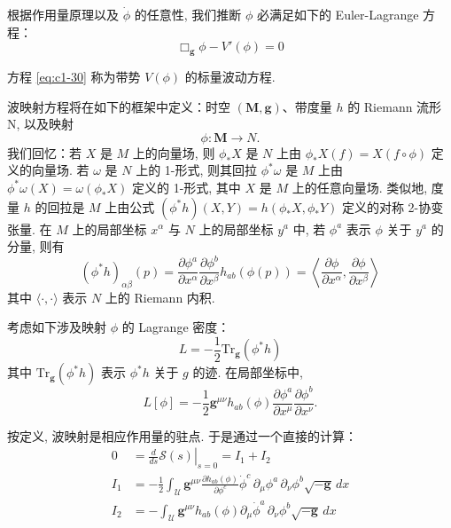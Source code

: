 根据作用量原理以及 $\dot{\phi}$ 的任意性, 我们推断 $\phi$ 必满足如下的 Euler-Lagrange 方程：
\begin{equation}
\Box_{\mathbf{g}}\phi - V'(\phi) = 0\label{eq:c1-30}
\end{equation}

方程 \eqref{eq:c1-30} 称为带势 $V(\phi)$ 的标量波动方程. 


波映射方程将在如下的框架中定义：时空 $(\mathbf{M}, \mathbf{g})$、带度量 $h$ 的 Riemann 流形 N, 以及映射
\[
\phi:\mathbf{M} \longrightarrow N.
\]
我们回忆：若 $X$ 是 $M$ 上的向量场, 则 $\phi_*X$ 是 $N$ 上由 $\phi_*X(f) = X(f\circ\phi)$ 定义的向量场. 若 $\omega$ 是 $N$ 上的 1-形式, 则其回拉 $\phi^*\omega$ 是 $M$ 上由 $\phi^*\omega(X) = \omega(\phi_*X)$ 定义的 1-形式, 其中 $X$ 是 $M$ 上的任意向量场. 类似地, 度量 $h$ 的回拉是 $M$ 上由公式 $(\phi^*h)(X, Y) = h(\phi_*X, \phi_*Y)$ 定义的对称 2-协变张量. 在 $M$ 上的局部坐标 $x^\alpha$ 与 $N$ 上的局部坐标 $y^a$ 中, 若 $\phi^a$ 表示 $\phi$ 关于 $y^a$ 的分量, 则有
\[
(\phi^*h)_{\alpha\beta}(p) = \frac{\partial\phi^a}{\partial x^\alpha}\frac{\partial\phi^b}{\partial x^\beta}h_{ab}(\phi(p)) = \left\langle\frac{\partial\phi}{\partial x^\alpha}, \frac{\partial\phi}{\partial x^\beta}\right\rangle
\]
其中 $\langle\cdot, \cdot\rangle$ 表示 $N$ 上的 Riemann 内积. 

考虑如下涉及映射 $\phi$ 的 Lagrange 密度：
\[
L = -\frac{1}{2}\mathrm{Tr}_{\mathbf{g}}(\phi^*h)
\]
其中 $\mathrm{Tr}_{\mathbf{g}}(\phi^*h)$ 表示 $\phi^*h$ 关于 $g$ 的迹. 在局部坐标中, 
\[
L[\phi] = -\frac{1}{2}\mathbf{g}^{\mu\nu}h_{ab}(\phi)\frac{\partial\phi^a}{\partial x^\mu}\frac{\partial\phi^b}{\partial x^\nu}.
\]

按定义, 波映射是相应作用量的驻点. 于是通过一个直接的计算：
\begin{equation}
\begin{aligned}
0 &= \left.\frac{d}{ds}\mathcal{S}(s)\right|_{s=0} = I_1 + I_2\\
I_1 &= -\frac{1}{2}\int_{\mathcal{U}}\mathbf{g}^{\mu\nu}\frac{\partial h_{ab}(\phi)}{\partial\phi^c}\dot{\phi}^c\, \partial_\mu\phi^a\, \partial_\nu\phi^b\sqrt{-\mathbf{g}}\, dx\\
I_2 &= -\int_{\mathcal{U}}\mathbf{g}^{\mu\nu}h_{ab}(\phi)\partial_\mu\dot{\phi}^a\, \partial_\nu\phi^b\sqrt{-\mathbf{g}}\, dx
\end{aligned}\label{eq:c1-31}
\end{equation}

